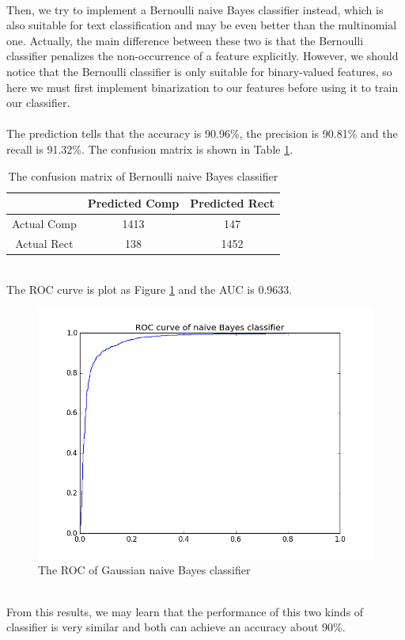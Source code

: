 \documentclass{article}
\begin{document}
\\
Then, we try to implement a Bernoulli naive Bayes classifier instead, which is also suitable for text classification and may be even better than the multinomial one. Actually, the main difference between these two is that the Bernoulli classifier penalizes the non-occurrence of a feature explicitly. However, we should notice that the Bernoulli classifier is only suitable for binary-valued features, so here we must first implement binarization to our features before using it to train our classifier.\\
\\
The prediction tells that the accuracy is 90.96\%, the precision is 90.81\% and the recall is 91.32\%. The confusion matrix is shown in Table \ref{tb:confu_bnb}.\\
\begin{table}
\begin{center}
\caption{The confusion matrix of Bernoulli naive Bayes classifier}
\label{tb:confu_bnb}
\begin{tabular}{|c|c|c|}
\hline
& Predicted Comp& Predicted Rect\\
\hline
Actual Comp&1413&147\\
\hline
Actual Rect&138&1452\\
\hline
\end{tabular}
\end{center}
\end{table}
\\
The ROC curve is plot as Figure \ref{fig:roc_bnb} and the AUC is 0.9633.\\
\begin{figure}[htbp]
\centering
\includegraphics[width=.6\textwidth]{g_naive_bayes_roc.png}
\caption{The ROC of Gaussian naive Bayes classifier}
\label{fig:roc_bnb}
\end{figure}
\\
From this results, we may learn that the performance of this two kinds of classifier is very similar and both can achieve an accuracy about 90\%.\\
\end{document}
